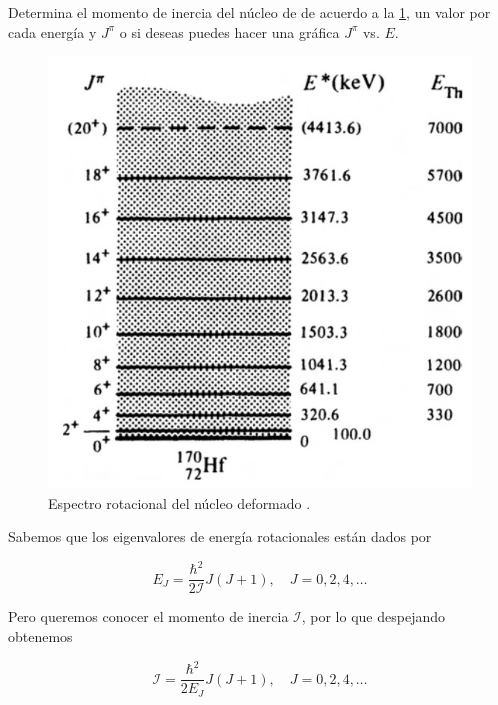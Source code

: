 \documentclass[./../main.tex]{subfiles}
\begin{document}
	\begin{exercise}
		Determina el momento de inercia del núcleo de  de acuerdo a la \cref{fig:hafmio-rot-spectrum}, un valor por cada energía y \(J^{\pi}\) o si deseas puedes hacer una gráfica \(J^{\pi}\) vs. \(E\).

		\begin{figure}[htb]
			\centering
			\includegraphics[scale=0.4]{rot_spectrum}
			\caption{Espectro rotacional del núcleo deformado .}			
			\label{fig:hafmio-rot-spectrum}
		\end{figure}

		\begin{solution}
			Sabemos que los eigenvalores de energía rotacionales están dados por

			\begin{equation*}
				E_{J} = \dfrac{\hbar^{2}}{2\mathcal{I}}J(J + 1),\quad J = 0, 2, 4, \ldots
			\end{equation*}

			Pero queremos conocer el momento de inercia \(\mathcal{I}\), por lo que despejando obtenemos

			\begin{equation*}
				\mathcal{I} = \dfrac{\hbar^{2}}{2E_{J}}J(J + 1), \quad J = 0, 2, 4, \ldots
			\end{equation*}


\end{solution}
\end{exercise}
\end{document}
